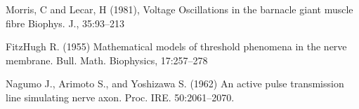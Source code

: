 \documentclass[11pt,a4paper]{scrartcl}
\begin{document}
\begin{thebibliography}{99}
\newblock Morris, C and Lecar, H (1981),
\newblock Voltage Oscillations in the barnacle giant muscle fibre
\newblock Biophys. J., 35:93--213

\newblock FitzHugh R. (1955) 
\newblock Mathematical models of threshold phenomena in the nerve membrane. 
\newblock Bull. Math. Biophysics, 17:257--278

\newblock Nagumo J., Arimoto S., and Yoshizawa S. (1962) 
\newblock An active pulse transmission line simulating nerve axon. 
\newblock Proc. IRE. 50:2061--2070.

\end{thebibliography}
\end{document}
